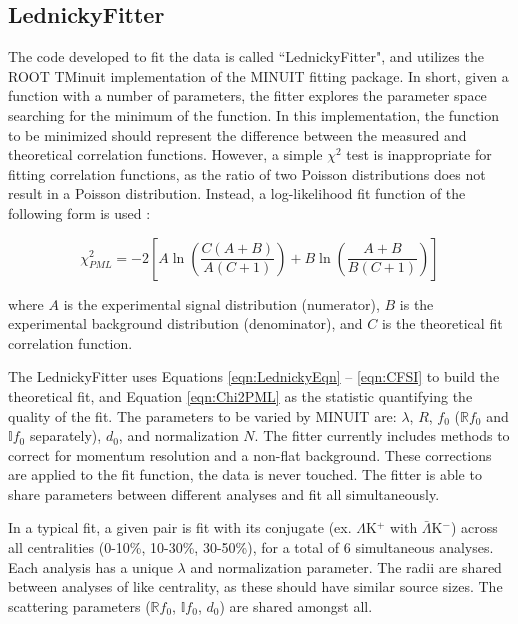 \documentclass[../AnalysisNoteJBuxton.tex]{subfiles}
\begin{document}
\subsection{LednickyFitter}
\label{LednickyFitter}


The code developed to fit the data is called ``LednickyFitter", and utilizes the ROOT TMinuit implementation of the MINUIT fitting package.
In short, given a function with a number of parameters, the fitter explores the parameter space searching for the minimum of the function.
In this implementation, the function to be minimized should represent the difference between the measured and theoretical correlation functions.
However, a simple $\chi^{2}$ test is inappropriate for fitting correlation functions, as the ratio of two Poisson distributions does not result in a Poisson distribution.
Instead, a log-likelihood fit function of the following form is used \cite{Lisa:2005dd}:

\begin{equation}
 \chi^{2}_{PML} = -2\left[A\ln\left(\frac{C(A+B)}{A(C+1)}\right) + B\ln\left(\frac{A+B}{B(C+1)}\right)\right]
\label{eqn:Chi2PML}
\end{equation}

where $A$ is the experimental signal distribution (numerator), $B$ is the experimental background distribution (denominator), and $C$ is the theoretical fit correlation function.

The LednickyFitter uses Equations \ref{eqn:LednickyEqn} -- \ref{eqn:CFSI} to build the theoretical fit, and Equation \ref{eqn:Chi2PML} as the statistic quantifying the quality of the fit.
The parameters to be varied by MINUIT are: $\lambda$, $R$, $f_{0}$ ($\mathbb{R}f_{0}$ and $\mathbb{I}f_{0}$ separately), $d_{0}$, and normalization $N$.
The fitter currently includes methods to correct for momentum resolution and a non-flat background.
These corrections are applied to the fit function, the data is never touched.
The fitter is able to share parameters between different analyses and fit all simultaneously.  

In a typical fit, a given pair is fit with its conjugate (ex. $\Lambda$K$^{+}$ with $\bar{\Lambda}$K$^{-}$) across all centralities (0-10\%, 10-30\%, 30-50\%), for a total of 6 simultaneous analyses.
Each analysis has a unique $\lambda$ and normalization parameter.
The radii are shared between analyses of like centrality, as these should have similar source sizes.
The scattering parameters ($\mathbb{R}f_{0}$, $\mathbb{I}f_{0}$, $d_{0}$) are shared amongst all.
\end{document}

